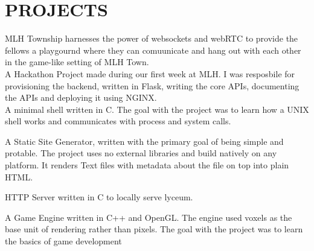 \documentclass[]{resume-openfont}
\begin{document}
\begin{minipage}[t]{0.66\textwidth}

\section{PROJECTS}

MLH Township harnesses the power of websockets and webRTC to provide the fellows a playgournd where they can comuunicate and hang out with each other in the game-like setting of MLH Town.\\

\sectionsep
{}
A Hackathon Project made during our first week at MLH. I was resposbile for provisioning the backend, written in Flask, writing the core APIs, documenting the APIs and deploying it using NGINX.\\

\sectionsep
{}
A minimal shell written in C. The goal with the project was to learn how a UNIX shell works and communicates with process and system calls.\\
\sectionsep

A Static Site Generator, written with the primary goal of being simple and protable. The project uses no external libraries and build natively on any platform. It renders Text files with metadata about the file on top into plain HTML.\\
\sectionsep

HTTP Server written in C to locally serve lyceum.
\sectionsep

A Game Engine written in C++ and OpenGL. The engine used voxels as the base unit of rendering rather than pixels. The goal with the project was to learn the basics of game development\\
\sectionsep

\end{minipage}
\end{document}
